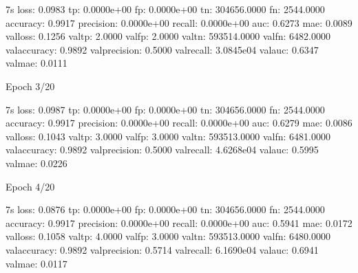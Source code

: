 \documentclass[letterpaper,10pt,english]{sphinxmanual}
\begin{document}
\begin{sphinxVerbatim}[commandchars=\\\{\}]
 \PYGZhy{} 7s \PYGZhy{} loss: 0.0983 \PYGZhy{} tp: 0.0000e+00 \PYGZhy{} fp: 0.0000e+00 \PYGZhy{} tn: 304656.0000 \PYGZhy{} fn: 2544.0000 \PYGZhy{} accuracy: 0.9917 \PYGZhy{} precision: 0.0000e+00 \PYGZhy{} recall: 0.0000e+00 \PYGZhy{} auc: 0.6273 \PYGZhy{} mae: 0.0089 \PYGZhy{} val\PYGZus{}loss: 0.1256 \PYGZhy{} val\PYGZus{}tp: 2.0000 \PYGZhy{} val\PYGZus{}fp: 2.0000 \PYGZhy{} val\PYGZus{}tn: 593514.0000 \PYGZhy{} val\PYGZus{}fn: 6482.0000 \PYGZhy{} val\PYGZus{}accuracy: 0.9892 \PYGZhy{} val\PYGZus{}precision: 0.5000 \PYGZhy{} val\PYGZus{}recall: 3.0845e\PYGZhy{}04 \PYGZhy{} val\PYGZus{}auc: 0.6347 \PYGZhy{} val\PYGZus{}mae: 0.0111
\end{sphinxVerbatim}

\begin{sphinxVerbatim}[commandchars=\\\{\}]
Epoch 3/20
\end{sphinxVerbatim}

\begin{sphinxVerbatim}[commandchars=\\\{\}]
 \PYGZhy{} 7s \PYGZhy{} loss: 0.0987 \PYGZhy{} tp: 0.0000e+00 \PYGZhy{} fp: 0.0000e+00 \PYGZhy{} tn: 304656.0000 \PYGZhy{} fn: 2544.0000 \PYGZhy{} accuracy: 0.9917 \PYGZhy{} precision: 0.0000e+00 \PYGZhy{} recall: 0.0000e+00 \PYGZhy{} auc: 0.6279 \PYGZhy{} mae: 0.0086 \PYGZhy{} val\PYGZus{}loss: 0.1043 \PYGZhy{} val\PYGZus{}tp: 3.0000 \PYGZhy{} val\PYGZus{}fp: 3.0000 \PYGZhy{} val\PYGZus{}tn: 593513.0000 \PYGZhy{} val\PYGZus{}fn: 6481.0000 \PYGZhy{} val\PYGZus{}accuracy: 0.9892 \PYGZhy{} val\PYGZus{}precision: 0.5000 \PYGZhy{} val\PYGZus{}recall: 4.6268e\PYGZhy{}04 \PYGZhy{} val\PYGZus{}auc: 0.5995 \PYGZhy{} val\PYGZus{}mae: 0.0226
\end{sphinxVerbatim}

\begin{sphinxVerbatim}[commandchars=\\\{\}]
Epoch 4/20
\end{sphinxVerbatim}

\begin{sphinxVerbatim}[commandchars=\\\{\}]
 \PYGZhy{} 7s \PYGZhy{} loss: 0.0876 \PYGZhy{} tp: 0.0000e+00 \PYGZhy{} fp: 0.0000e+00 \PYGZhy{} tn: 304656.0000 \PYGZhy{} fn: 2544.0000 \PYGZhy{} accuracy: 0.9917 \PYGZhy{} precision: 0.0000e+00 \PYGZhy{} recall: 0.0000e+00 \PYGZhy{} auc: 0.5941 \PYGZhy{} mae: 0.0172 \PYGZhy{} val\PYGZus{}loss: 0.1058 \PYGZhy{} val\PYGZus{}tp: 4.0000 \PYGZhy{} val\PYGZus{}fp: 3.0000 \PYGZhy{} val\PYGZus{}tn: 593513.0000 \PYGZhy{} val\PYGZus{}fn: 6480.0000 \PYGZhy{} val\PYGZus{}accuracy: 0.9892 \PYGZhy{} val\PYGZus{}precision: 0.5714 \PYGZhy{} val\PYGZus{}recall: 6.1690e\PYGZhy{}04 \PYGZhy{} val\PYGZus{}auc: 0.6941 \PYGZhy{} val\PYGZus{}mae: 0.0117
\end{sphinxVerbatim}
\end{document}
